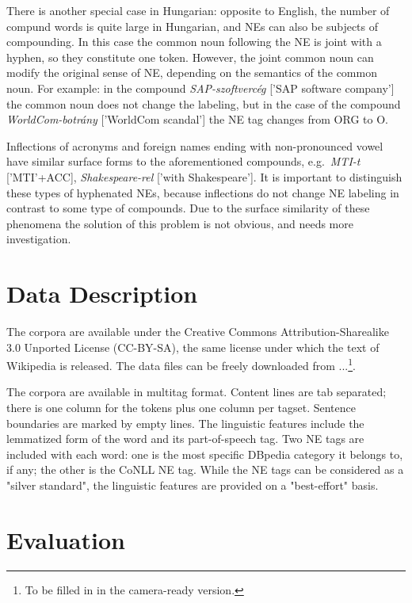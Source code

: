 \documentclass[11pt]{article}
\begin{document}
There is another special case in Hungarian: opposite to English, the number of compund words is quite large in Hungarian, and NEs can also be subjects of compounding. In this case the common noun following the NE is joint with a hyphen, so they constitute one token. However, the joint common noun can modify the original sense of NE, depending on the semantics of the common noun. For example: in the compound \textit{SAP-szoftvercég} ['SAP software company'] the common noun does not change the labeling, but in the case of the compound \textit{WorldCom-botrány} ['WorldCom scandal'] the NE tag changes from ORG to O. 

Inflections of acronyms and foreign names ending with non-pronounced vowel have similar surface forms to the aforementioned compounds, e.g.~\textit{MTI-t} ['MTI'+ACC], \textit{Shakespeare-rel} ['with Shakespeare']. It is important to distinguish these types of hyphenated NEs, because inflections do not change NE labeling in contrast to some type of compounds. Due to the surface similarity of these phenomena the solution of this problem is not obvious, and needs more investigation. 


\section{Data Description}
\label{sec:data}

The corpora are available under the Creative Commons Attribution-Sharealike 3.0 Unported License (CC-BY-SA), the same license under which the text of Wikipedia is released. The data files can be freely downloaded from ...\footnote{To be filled in in the camera-ready version.}.

The corpora are available in multitag format. Content lines are tab separated; there is one column for the tokens plus one column per tagset. Sentence boundaries are marked by empty lines. The linguistic features include the lemmatized form of the word and its part-of-speech tag. Two NE tags are included with each word: one is the most specific DBpedia category it belongs to, if any; the other is the CoNLL NE tag. While the NE tags can be considered as a "silver standard", the linguistic features are provided on a "best-effort" basis.

\section{Evaluation}
\label{sec:eval}
\end{document}

